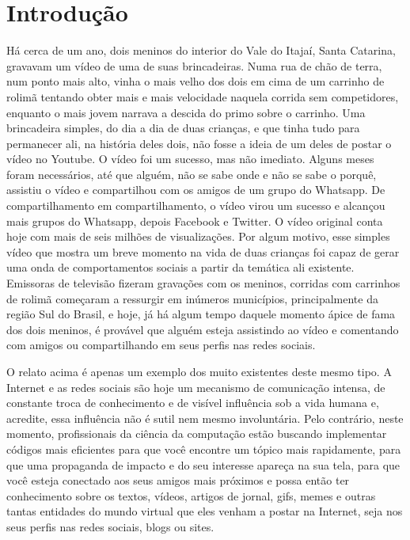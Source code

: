 \documentclass[
	12pt,				%
	openright,			%
	oneside,			%
	a4paper,			%
	english,			%
	french,				%
	spanish,			%
	brazil				%
	]{abntex2}
\begin{document}
\frenchspacing

\pretextual

\imprimirfolhaderosto

\tableofcontents*
\cleardoublepage

\textual

\chapter[Introdução]{Introdução}
Há cerca de um ano, dois meninos do interior do Vale do Itajaí, Santa
Catarina, gravavam um vídeo de uma de suas brincadeiras. Numa rua de
chão de terra, num ponto mais alto, vinha o mais velho dos dois em
cima de um carrinho de rolimã tentando obter mais e mais velocidade
naquela corrida sem competidores, enquanto o mais jovem narrava a
descida do primo sobre o carrinho. Uma brincadeira simples, do dia a
dia de duas crianças, e que tinha tudo para permanecer ali, na
história deles dois, não fosse a ideia de um deles de postar o vídeo
no Youtube. O vídeo foi um sucesso, mas não imediato. Alguns meses
foram necessários, até que alguém, não se sabe onde e não se sabe o
porquê, assistiu o vídeo e compartilhou com os amigos de um grupo do
Whatsapp. De compartilhamento em compartilhamento, o vídeo virou um
sucesso e alcançou mais grupos do Whatsapp, depois Facebook e
Twitter. O vídeo original conta hoje com mais de seis milhões de
visualizações. Por algum motivo, esse simples vídeo que mostra um
breve momento na vida de duas crianças foi capaz de gerar uma onda de
comportamentos sociais a partir da temática ali existente. Emissoras
de televisão fizeram gravações com os meninos, corridas com carrinhos
de rolimã começaram a ressurgir em inúmeros municípios, principalmente
da região Sul do Brasil, e hoje, já há algum tempo daquele momento
ápice de fama dos dois meninos, é provável que alguém esteja
assistindo ao vídeo e comentando com amigos ou compartilhando em seus
perfis nas redes sociais.

O relato acima é apenas um exemplo dos muito existentes deste mesmo
tipo. A Internet e as redes sociais são hoje um mecanismo de
comunicação intensa, de constante troca de conhecimento e de visível
influência sob a vida humana e, acredite, essa influência não é sutil
nem mesmo involuntária. Pelo contrário, neste momento, profissionais
da ciência da computação estão buscando implementar códigos mais
eficientes para que você encontre um tópico mais rapidamente, para que
uma propaganda de impacto e do seu interesse apareça na sua tela, para
que você esteja conectado aos seus amigos mais próximos e possa então
ter conhecimento sobre os textos, vídeos, artigos de jornal, gifs,
memes e outras tantas entidades do mundo virtual que eles venham a
postar na Internet, seja nos seus perfis nas redes sociais, blogs ou
sites.
\end{document}
